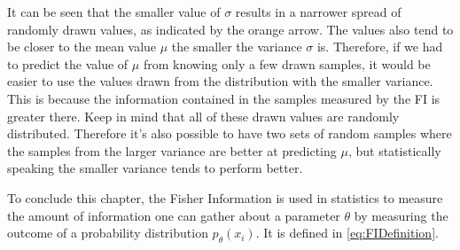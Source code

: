 It can be seen that the smaller value of $\sigma$ results in a narrower spread of randomly drawn values, as indicated by the orange arrow. The values also tend to be closer to the mean value $\mu$ the smaller the variance $\sigma$ is. Therefore, if we had to predict the value of $\mu$ from knowing only a few drawn samples, it would be easier to use the values drawn from the distribution with the smaller variance. This is because the information contained in the samples measured by the FI is greater there. Keep in mind that all of these drawn values are randomly distributed. Therefore it's also possible to have two sets of random samples where the samples from the larger variance are better at predicting $\mu$, but statistically speaking the smaller variance tends to perform better.

To conclude this chapter, the Fisher Information is used in statistics to measure the amount of information one can gather about a parameter $\theta$ by measuring the outcome of a probability distribution $p_\theta(x_i)$. It is defined in \cref{eq:FIDefinition}.

